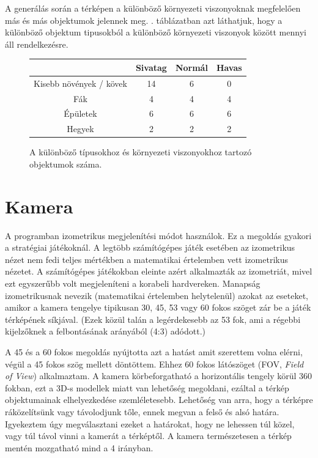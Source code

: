 A generálás során a térképen a különböző környezeti viszonyoknak megfelelően más és más objektumok jelennek meg. . táblázatban azt láthatjuk, hogy a különböző objektum tipusokból a különböző környezeti viszonyok között mennyi áll rendelkezésre.

\begin{figure}[h!]
  \centering
  \begin{tabular}{ | c | c | c | c | }
    \hline
     & Sivatag & Normál & Havas \\ \hline
    Kisebb növények / kövek & 14 & 6 & 0 \\ \hline
    Fák & 4 & 4 & 4 \\ \hline
    Épületek & 6 & 6 & 6 \\ \hline
    Hegyek & 2 & 2 & 2 \\ \hline
  \end{tabular}
  \caption{A különböző típusokhoz és környezeti viszonyokhoz tartozó objektumok száma.}
  \label{tab:models}
\end{figure}
 \newpage
\section{Kamera}
\cite{RTS_Camera}
\cite{Isometic}

A programban izometrikus megjelenítési módot használok. Ez a megoldás gyakori a stratégiai játékoknál. A legtöbb számítógépes játék esetében az izometrikus nézet nem fedi teljes mértékben a matematikai értelemben vett izometrikus nézetet. A számítógépes játékokban eleinte azért alkalmazták az izometriát, mivel ezt egyszerűbb volt megjeleníteni a korabeli hardvereken. Manapság  izometrikusnak nevezik (matematikai értelemben helytelenül) azokat az eseteket, amikor a kamera tengelye tipikusan 30, 45, 53 vagy 60 fokos szöget zár be a játék térképének síkjával. (Ezek közül talán a legérdekesebb az 53 fok, ami a régebbi kijelzőknek a felbontásának arányából (4:3) adódott.)

A 45 és a 60 fokos megoldás nyújtotta azt a hatást amit szerettem volna elérni, végül a 45 fokos szög mellett döntöttem. Ehhez 60 fokos látószöget (FOV, \textit{Field of View}) alkalmaztam. A kamera körbeforgatható a horizontális tengely körül 360 fokban, ezt a 3D-s modellek miatt van lehetőség megoldani, ezáltal a térkép objektumainak elhelyezkedése szemléletesebb. Lehetőség van arra, hogy a térképre ráközelítsünk vagy távolodjunk tőle, ennek megvan a felső és alsó határa. Igyekeztem úgy megválasztani ezeket a határokat, hogy ne lehessen túl közel, vagy túl távol vinni a kamerát a térképtől. A kamera természetesen a térkép mentén mozgatható mind a 4 irányban. 

